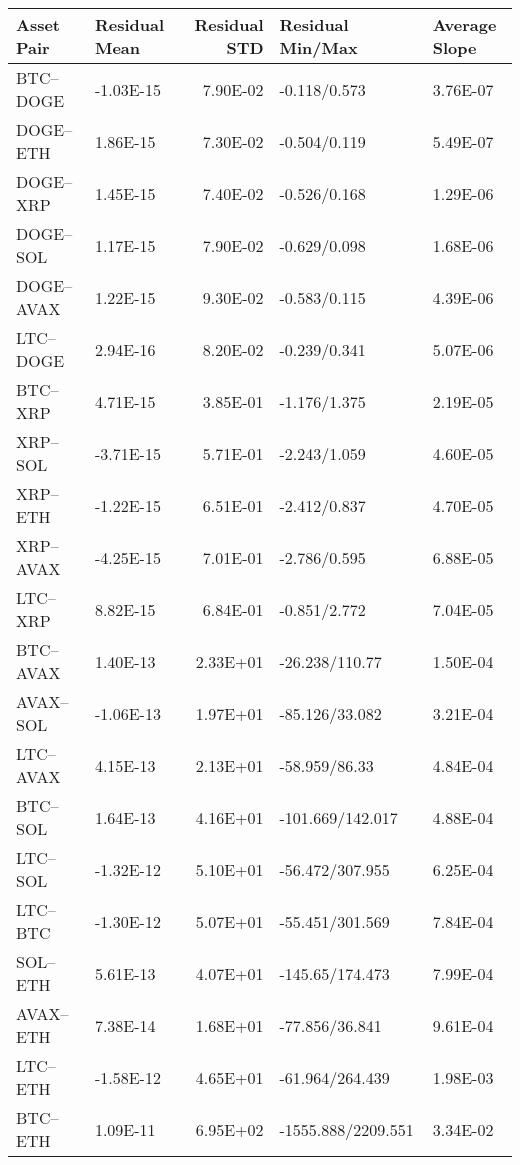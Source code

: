 \begin{tabular}{llrll}
\toprule
Asset Pair & Residual Mean & Residual STD & Residual Min/Max & Average Slope \\
\midrule
BTC–DOGE & -1.03E-15 & 7.90E-02 & -0.118/0.573 & 3.76E-07 \\
DOGE–ETH & 1.86E-15 & 7.30E-02 & -0.504/0.119 & 5.49E-07 \\
DOGE–XRP & 1.45E-15 & 7.40E-02 & -0.526/0.168 & 1.29E-06 \\
DOGE–SOL & 1.17E-15 & 7.90E-02 & -0.629/0.098 & 1.68E-06 \\
DOGE–AVAX & 1.22E-15 & 9.30E-02 & -0.583/0.115 & 4.39E-06 \\
LTC–DOGE & 2.94E-16 & 8.20E-02 & -0.239/0.341 & 5.07E-06 \\
BTC–XRP & 4.71E-15 & 3.85E-01 & -1.176/1.375 & 2.19E-05 \\
XRP–SOL & -3.71E-15 & 5.71E-01 & -2.243/1.059 & 4.60E-05 \\
XRP–ETH & -1.22E-15 & 6.51E-01 & -2.412/0.837 & 4.70E-05 \\
XRP–AVAX & -4.25E-15 & 7.01E-01 & -2.786/0.595 & 6.88E-05 \\
LTC–XRP & 8.82E-15 & 6.84E-01 & -0.851/2.772 & 7.04E-05 \\
BTC–AVAX & 1.40E-13 & 2.33E+01 & -26.238/110.77 & 1.50E-04 \\
AVAX–SOL & -1.06E-13 & 1.97E+01 & -85.126/33.082 & 3.21E-04 \\
LTC–AVAX & 4.15E-13 & 2.13E+01 & -58.959/86.33 & 4.84E-04 \\
BTC–SOL & 1.64E-13 & 4.16E+01 & -101.669/142.017 & 4.88E-04 \\
LTC–SOL & -1.32E-12 & 5.10E+01 & -56.472/307.955 & 6.25E-04 \\
LTC–BTC & -1.30E-12 & 5.07E+01 & -55.451/301.569 & 7.84E-04 \\
SOL–ETH & 5.61E-13 & 4.07E+01 & -145.65/174.473 & 7.99E-04 \\
AVAX–ETH & 7.38E-14 & 1.68E+01 & -77.856/36.841 & 9.61E-04 \\
LTC–ETH & -1.58E-12 & 4.65E+01 & -61.964/264.439 & 1.98E-03 \\
BTC–ETH & 1.09E-11 & 6.95E+02 & -1555.888/2209.551 & 3.34E-02 \\
\bottomrule
\end{tabular}
